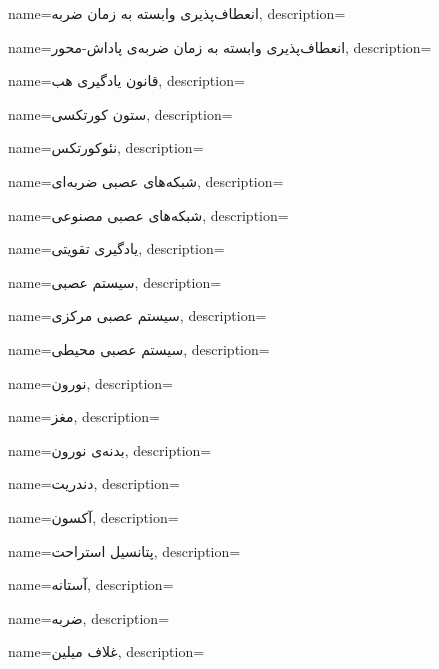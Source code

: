 {
	name={انعطاف‌پذیری وابسته به زمان ضربه},
	description=\hfill{}
}

{
	name={انعطاف‌پذیری وابسته به زمان ضربه‌ی پاداش-محور},
	description=\hfill{}
}

{
    name={قانون یادگیری هب},
    description=\hfill{}
}

{
name={ستون‌ کورتکسی},
description=\hfill{}
}

{
name={نئوکورتکس},
description=\hfill{}
}

{
	name={شبکه‌های عصبی ضربه‌ای},
	description=\hfill{}
}

{
	name={شبکه‌های عصبی مصنوعی},
	description=\hfill{}
}

{
	name={یادگیری تقویتی},
	description=\hfill{}
}

{
	name={سیستم عصبی},
	description=\hfill{}
}

{
	name={سیستم عصبی مرکزی},
	description=\hfill{}
}

{
	name={سیستم عصبی محیطی},
	description=\hfill{}
}

{
	name={نورون},
	description=\hfill{}
}

{
	name={مغز},
	description=\hfill{}
}

{
	name={بدنه‌ی نورون},
	description=\hfill{}
}

{
	name={دندریت},
	description=\hfill{}
}

{
	name={آکسون},
	description=\hfill{}
}

{
	name={پتانسیل استراحت},
	description=\hfill{}
}

{
	name={آستانه},
	description=\hfill{}
}

{
	name={ضربه},
	description=\hfill{}
}

{
	name={غلاف میلین},
	description=\hfill{}
}

